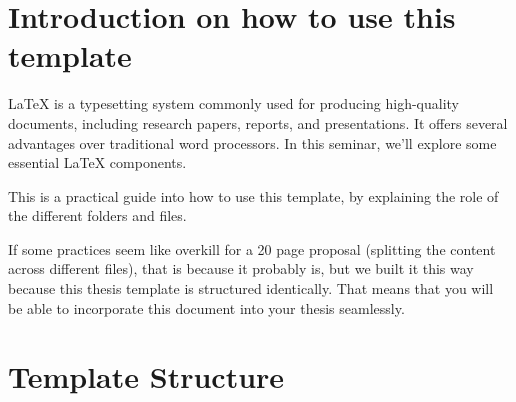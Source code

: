 \section{Introduction on how to use this template}
LaTeX is a typesetting system commonly used for producing high-quality documents, including research papers, reports, and presentations. It offers several advantages over traditional word processors. In this seminar, we'll explore some essential LaTeX components.

This is a practical guide into how to use this template, by explaining the role of the different folders and files.

If some practices seem like overkill for a 20 page proposal (splitting the content across different files), that is because it probably is, but we built it this way because this thesis template is structured identically. That means that you will be able to incorporate this document into your thesis seamlessly.
\cite{modrnCOm}
\section{Template Structure}


